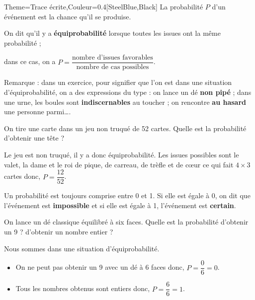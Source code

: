 \begin{Maquette}[Cours]{Theme={Trace écrite},Couleur={0.4[SteelBlue,Black]}}
      La probabilité $P$ d'un événement est \og la chance \fg{} qu'il se produise.

      \begin{definition*}{}
         On dit qu'il y a \textbf{équiprobabilité} lorsque toutes les issues ont la même probabilité ; \par \smallskip
         dans ce cas, on a $P=\dfrac{\textrm{nombre d'issues favorables}}{\textrm{nombre de cas possibles}}$.
      \end{definition*}

      Remarque : dans un exercice, pour signifier que l'on est dans une situation d'équiprobabilité, on a des expressions du type : \og on lance un dé \textbf{non pipé} \fg ; \og dans une urne, les boules sont \textbf{indiscernables} au toucher \fg ; \og on rencontre \textbf{au hasard} une personne parmi\dots \fg.

      \begin{exemple*}{}
         On tire une carte dans un jeu non truqué de 52 cartes. Quelle est la probabilité d'obtenir une tête ? \par
         Le jeu est non truqué, il y a donc équiprobabilité. Les issues possibles sont le valet, la dame et le roi de pique, de carreau, de trèfle et de c\oe ur ce qui fait $4\times3$ cartes donc, $P =\dfrac{12}{52}$.
      \end{exemple*}

      \begin{propriete*}{}
         Un probabilité est toujours comprise entre 0 et 1. Si elle est égale à 0, on dit que l'événement est {\bf impossible} et si elle est égale à 1, l'événement est {\bf certain}.
      \end{propriete*}

      \begin{exemple*}{}
         On lance un dé classique équilibré à six faces. Quelle est la probabilité d'obtenir un 9 ? d'obtenir un nombre entier ? \par
         Nous sommes dans une situation d'équiprobabilité.
         \begin{itemize} 
            \item On ne peut pas obtenir un 9 avec un dé à 6 faces donc, $P =\dfrac06 =0$.
            \item Tous les nombres obtenus sont entiers donc, $P =\dfrac66 =1$.
         \end{itemize}
      \end{exemple*}

\end{Maquette}


